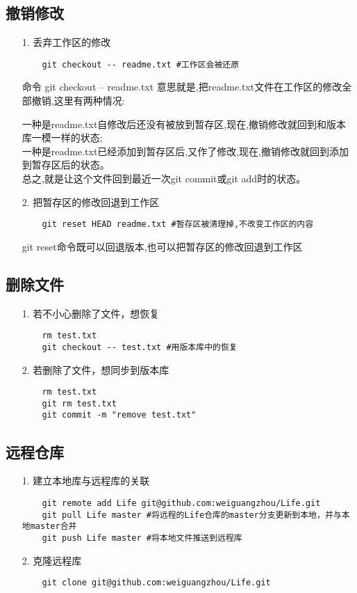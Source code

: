 \documentclass[a4paper,left=1.5cm,right=1.5cm,11pt]{article}
\begin{document}
\subsection{撤销修改}
\begin{itemize}
	\item[1.]丢弃工作区的修改
	\begin{lstlisting}
	git checkout -- readme.txt #工作区会被还原
	\end{lstlisting} 
	命令 git checkout -- readme.txt 意思就是,把readme.txt文件在工作区的修改全部撤销,这里有两种情况:\par
	一种是readme.txt自修改后还没有被放到暂存区,现在,撤销修改就回到和版本库一模一样的状态;\\
	一种是readme.txt已经添加到暂存区后,又作了修改,现在,撤销修改就回到添加到暂存区后的状态。\\
	总之,就是让这个文件回到最近一次git commit或git add时的状态。
	\item[2.]把暂存区的修改回退到工作区
	\begin{lstlisting}
	git reset HEAD readme.txt #暂存区被清理掉,不改变工作区的内容
	\end{lstlisting} 
	git reset命令既可以回退版本,也可以把暂存区的修改回退到工作区
\end{itemize}
\subsection{删除文件}
\begin{itemize}
	\item[1.]若不小心删除了文件，想恢复
	\begin{lstlisting}
	rm test.txt
	git checkout -- test.txt #用版本库中的恢复
	\end{lstlisting}
	\item[2.]若删除了文件，想同步到版本库
	\begin{lstlisting}
	rm test.txt
	git rm test.txt 
	git commit -m "remove test.txt"
	\end{lstlisting}
\end{itemize}
\subsection{远程仓库}
\begin{itemize}
	\item[1.]建立本地库与远程库的关联
	\begin{lstlisting}
	git remote add Life git@github.com:weiguangzhou/Life.git
	git pull Life master #将远程的Life仓库的master分支更新到本地，并与本地master合并
	git push Life master #将本地文件推送到远程库
	\end{lstlisting}
	\item[2.]克隆远程库
	\begin{lstlisting}
	git clone git@github.com:weiguangzhou/Life.git
	\end{lstlisting}
\end{itemize}
\end{document}
